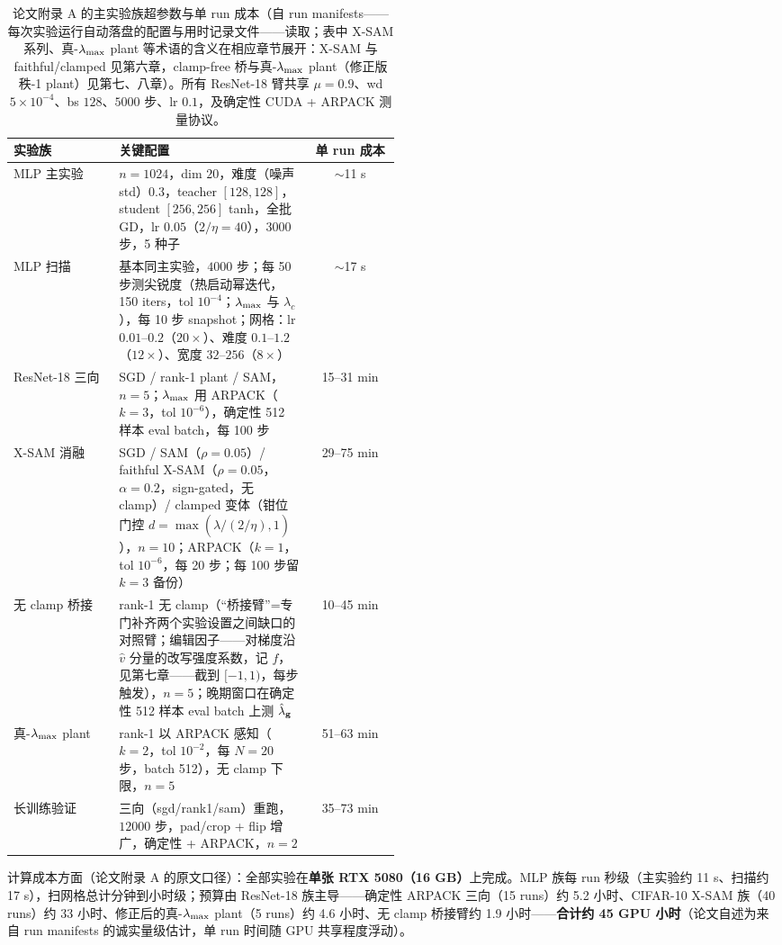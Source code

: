 \begin{table}[!ht]
\centering\small
\caption{论文附录 A 的主实验族超参数与单 run 成本（自 run
manifests——每次实验运行自动落盘的配置与用时记录文件——读取；表中
X-SAM 系列、真-$\lambda_{\max}$ plant 等术语的含义在相应章节展开：X-SAM 与
faithful/clamped 见第六章，clamp-free 桥与真-$\lambda_{\max}$ plant（修正版
秩-1 plant）见第七、八章）。所有
ResNet-18 臂共享 $\mu{=}0.9$、wd $5{\times}10^{-4}$、bs $128$、$5000$ 步、lr
$0.1$，及确定性 CUDA + ARPACK 测量协议。}
\label{tab:ch03-hyper}
\begin{tabular}{lp{0.5\linewidth}c}
\toprule
实验族 & 关键配置 & 单 run 成本 \\
\midrule
MLP 主实验 & $n{=}1024$，dim $20$，难度（噪声 std）$0.3$，teacher $[128,128]$，student $[256,256]$ tanh，全批 GD，lr $0.05$（$2/\eta{=}40$），$3000$ 步，5 种子 & $\sim$11 s \\
MLP 扫描 & 基本同主实验，$4000$ 步；每 50 步测尖锐度（热启动幂迭代，150 iters，tol $10^{-4}$；$\lambda_{\max}$ 与 $\lambda_c$），每 10 步 snapshot；网格：lr $0.01$--$0.2$（$20\times$）、难度 $0.1$--$1.2$（$12\times$）、宽度 $32$--$256$（$8\times$） & $\sim$17 s \\
ResNet-18 三向 & SGD / rank-1 plant / SAM，$n{=}5$；$\lambda_{\max}$ 用 ARPACK（$k{=}3$，tol $10^{-6}$），确定性 512 样本 eval batch，每 100 步 & 15--31 min \\
X-SAM 消融 & SGD / SAM（$\rho{=}0.05$）/ faithful X-SAM（$\rho{=}0.05$，$\alpha{=}0.2$，sign-gated，无 clamp）/ clamped 变体（钳位门控 $d{=}\max(\hat\lambda/(2/\eta),1)$），$n{=}10$；ARPACK（$k{=}1$，tol $10^{-6}$，每 20 步；每 100 步留 $k{=}3$ 备份） & 29--75 min \\
无 clamp 桥接 & rank-1 无 clamp（“桥接臂”=专门补齐两个实验设置之间缺口的对照臂；编辑因子——对梯度沿 $\hat v$ 分量的改写强度系数，记 $f$，见第七章——截到 $[-1,1)$，每步触发），$n{=}5$；晚期窗口在确定性 512 样本 eval batch 上测 $\hat{\lambda}_{\mathbf{g}}$ & 10--45 min \\
真-$\lambda_{\max}$ plant & rank-1 以 ARPACK 感知（$k{=}2$，tol $10^{-2}$，每 $N{=}20$ 步，batch 512），无 clamp 下限，$n{=}5$ & 51--63 min \\
长训练验证 & 三向（sgd/rank1/sam）重跑，$12000$ 步，pad/crop + flip 增广，确定性 + ARPACK，$n{=}2$ & 35--73 min \\
\bottomrule
\end{tabular}
\end{table}

计算成本方面（论文附录 A 的原文口径）：全部实验在\textbf{单张 RTX 5080（16
GB）}上完成。MLP 族每 run 秒级（主实验约 11 s、扫描约 17
s），扫网格总计分钟到小时级；预算由 ResNet-18 族主导——确定性 ARPACK 三向（15
runs）约 5.2 小时、CIFAR-10 X-SAM 族（40 runs）约 33 小时、修正后的真-$\lambda_{\max}$
plant（5 runs）约 4.6 小时、无 clamp 桥接臂约 1.9 小时——\textbf{合计约 45 GPU
小时}（论文自述为来自 run manifests 的诚实量级估计，单 run 时间随 GPU
共享程度浮动）。

